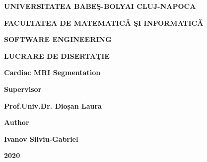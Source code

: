 \begin{titlepage}

    \rmfamily
    
    \begin{center}
    
    \textbf{\large{UNIVERSITATEA BABEŞ-BOLYAI CLUJ-NAPOCA}}
   
    \vspace{0.5cm}
   
    \textbf{\large{FACULTATEA DE MATEMATICǍ ŞI INFORMATICǍ}}
    
    \vspace{0.5cm}
   
    \textbf{\large{SOFTWARE ENGINEERING}}
        
    \vspace{4cm}

    \textbf{\Large{LUCRARE DE DISERTAŢIE}}
    
    \vspace{0.5cm}
    
    \textbf{\Large{Cardiac MRI Segmentation}}
    \end{center}
    
    \vspace{4cm}
     
    \begin{flushleft}
    \textbf{\Large{Supervisor}}
    
    \vspace{0.5cm}
    
    \textbf{\Large{Prof.Univ.Dr. Dioșan Laura}}
    \end{flushleft}
    
     \vspace{2cm}
     
    \begin{flushright}
    
    \textbf{\Large{Author}}
    
    \vspace{0.5cm}
    
    \textbf{\Large{Ivanov Silviu-Gabriel}}
    
    \end{flushright}
    
    \vfill
    
    \begin{center}
    
    \textbf{\Large{2020}}
    
    \end{center}
    
\end{titlepage}